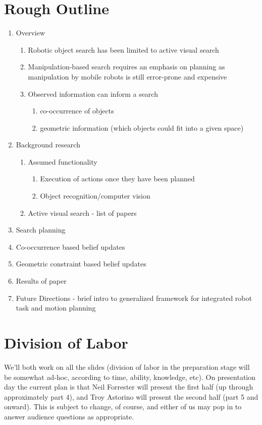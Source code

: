 \documentclass{article}
\begin{document}
\section{Rough Outline}
\begin{enumerate}
\item Overview
\begin{enumerate}
\item Robotic object search has been limited to active visual search
\item Manipulation-based search requires an emphasis on planning as manipulation by
mobile robots is still error-prone and expensive
\item Observed information can inform a search
\begin{enumerate}
\item co-occurrence of objects
\item geometric information (which objects could fit into a given space)
\end{enumerate}
\end{enumerate}
\item Background research
\begin{enumerate}
\item Assumed functionality 
\begin{enumerate}
\item Execution of actions once they have been planned
\item Object recognition/computer vision
\end{enumerate}
\item Active visual search - list of papers
\end{enumerate}
\item Search planning
\item Co-occurrence based belief updates
\item Geometric constraint based belief updates
\item Results of paper
\item Future Directions - brief intro to generalized framework for integrated robot task and
motion planning
\end{enumerate}

\section{Division of Labor}
We’ll both work on all the slides (division of labor in the preparation stage
will be somewhat ad-hoc, according to time, ability, knowledge, etc). On
presentation day the current plan is that Neil Forrester will present the first
half (up through approximately part 4), and Troy Astorino will present the
second half (part 5 and onward). This is subject to change, of course, and
either of us may pop in to answer audience questions as appropriate.
\end{document}
